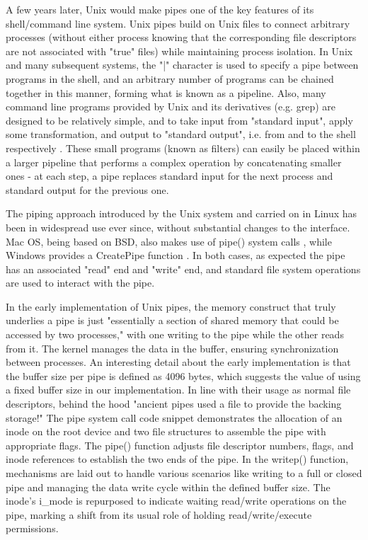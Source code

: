 A few years later, Unix would make pipes one of the key features of its shell/command line system. Unix pipes build on Unix files to connect arbitrary processes (without either process knowing that the corresponding file descriptors are not associated with "true" files) while maintaining process isolation. In Unix and many subsequent systems, the "|" character is used to specify a pipe between programs in the shell, and an arbitrary number of programs can be chained together in this manner, forming what is known as a pipeline. Also, many command line programs provided by Unix and its derivatives (e.g. grep) are designed to be relatively simple, and to take input from "standard input", apply some transformation, and output to "standard output", i.e. from and to the shell respectively \cite{unix2}.  These small programs (known as filters) can easily be placed within a larger pipeline that performs a complex operation by concatenating smaller ones - at each step, a pipe replaces standard input for the next process and standard output for the previous one.  

The piping approach introduced by the Unix system and carried on in Linux has been in widespread use ever since, without substantial changes to the interface. Mac OS, being based on BSD, also makes use of pipe() system calls \cite{macos}, while Windows provides a CreatePipe function \cite{windows}.  In both cases, as expected the pipe has an associated "read" end and "write" end, and standard file system operations are used to interact with the pipe.

In the early implementation of Unix pipes, the memory construct that truly underlies a pipe is just "essentially a section of shared memory that could be accessed by two processes,"\cite{menonSen} with one writing to the pipe while the other reads from it. The kernel manages the data in the buffer, ensuring synchronization between processes. An interesting detail about the early implementation is that the buffer size per pipe is defined as 4096 bytes, which suggests the value of using a fixed buffer size in our implementation. In line with their usage as normal file descriptors, behind the hood "ancient pipes used a file to provide the backing storage!"\cite{menonSen} The pipe system call code snippet demonstrates the allocation of an inode on the root device and two file structures to assemble the pipe with appropriate flags. The pipe() function adjusts file descriptor numbers, flags, and inode references to establish the two ends of the pipe. In the writep() function, mechanisms are laid out to handle various scenarios like writing to a full or closed pipe and managing the data write cycle within the defined buffer size. The inode's i\_mode is repurposed to indicate waiting read/write operations on the pipe, marking a shift from its usual role of holding read/write/execute permissions.\cite{menonSen}

